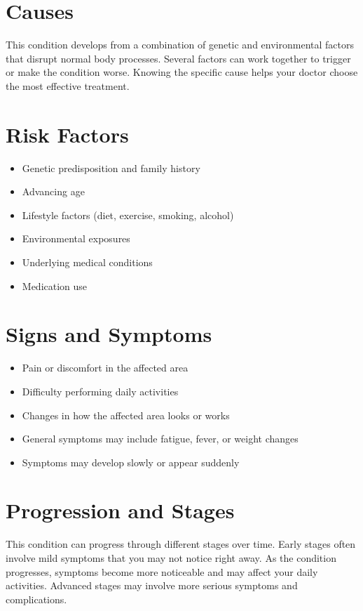 \section{Causes}
This condition develops from a combination of genetic and environmental factors that disrupt normal body processes. Several factors can work together to trigger or make the condition worse. Knowing the specific cause helps your doctor choose the most effective treatment.

\section{Risk Factors}

\begin{itemize}[noitemsep]
  \item Genetic predisposition and family history
  \item Advancing age
  \item Lifestyle factors (diet, exercise, smoking, alcohol)
  \item Environmental exposures
  \item Underlying medical conditions
  \item Medication use
\end{itemize}

\section{Signs and Symptoms}

\begin{itemize}[noitemsep]
  \item Pain or discomfort in the affected area
  \item Difficulty performing daily activities
  \item Changes in how the affected area looks or works
  \item General symptoms may include fatigue, fever, or weight changes
  \item Symptoms may develop slowly or appear suddenly
\end{itemize}

\section{Progression and Stages}
This condition can progress through different stages over time. Early stages often involve mild symptoms that you may not notice right away. As the condition progresses, symptoms become more noticeable and may affect your daily activities. Advanced stages may involve more serious symptoms and complications.

